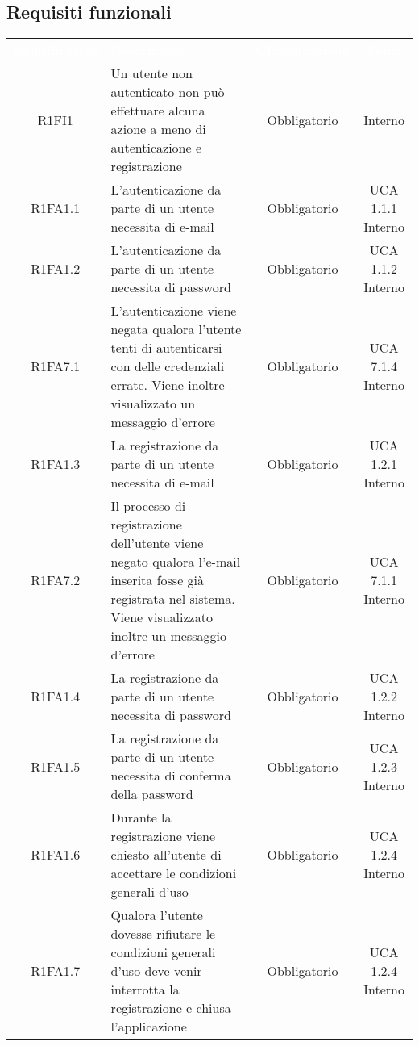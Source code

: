 \renewcommand{\o}{Obbligatorio}
\renewcommand{\d}{Desiderabile}
\newcommand{\op}{Opzionale}
\subsection{Requisiti funzionali}
{
\renewcommand{\arraystretch}{1.5}
\centering
\begin{longtable}{ c C{4cm} c c}
\textcolor{white}{\textbf{Identificativo}} & \textcolor{white}{\textbf{Descrizione}} & \textcolor{white}{\textbf{Classificazione}} & \textcolor{white}{\textbf{Fonti}}\\	

R1FI1 & Un utente non autenticato non può effettuare alcuna azione a meno di autenticazione e registrazione & \o & Interno\\

R1FA1.1 & L'autenticazione da parte di un utente necessita di e-mail & \o & UCA 1.1.1 Interno\\

R1FA1.2 & L'autenticazione da parte di un utente necessita di password & \o & UCA 1.1.2 Interno\\

R1FA7.1 & L'autenticazione viene negata qualora l'utente tenti di autenticarsi con delle credenziali errate. Viene inoltre visualizzato un messaggio d'errore & \o & UCA 7.1.4 Interno\\

R1FA1.3 & La registrazione da parte di un utente necessita di e-mail & \o & UCA 1.2.1 Interno\\

R1FA7.2 & Il processo di registrazione dell'utente viene negato qualora l'e-mail inserita fosse già registrata nel sistema. Viene visualizzato inoltre un messaggio d'errore & \o & UCA 7.1.1 Interno\\

R1FA1.4 & La registrazione da parte di un utente necessita di password & \o & UCA 1.2.2 Interno\\

R1FA1.5 & La registrazione da parte di un utente necessita di conferma della password & \o & UCA 1.2.3 Interno\\

R1FA1.6 & Durante la registrazione viene chiesto all'utente di accettare le condizioni generali d'uso & \o & UCA 1.2.4 Interno\\

R1FA1.7 & Qualora l'utente dovesse rifiutare le condizioni generali d'uso deve venir interrotta la registrazione e chiusa l'applicazione & \o & UCA 1.2.4 Interno\\


\end{longtable}}
